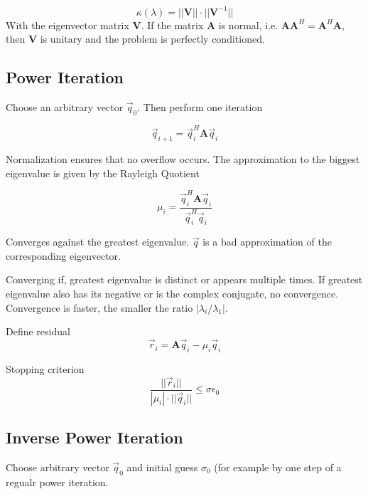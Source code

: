 \documentclass[
    a4paper,
    11pt
]{article}
\begin{document}
\begin{equation}
    \kappa(\lambda) = ||\mathbf{V}||\cdot||\mathbf{V}^{-1}||
\end{equation}
With the eigenvector matrix $\mathbf{V}$. If the matrix $\mathbf{A}$ is normal,
i.e. $\mathbf{AA}^H = \mathbf{A}^H \mathbf{A}$, then $\mathbf{V}$ is unitary and
the problem is perfectly conditioned.

\subsection{Power Iteration}

Choose an arbitrary vector $\vec{q}_0$. Then perform one iteration

\begin{equation}
    \vec{q}_{i+1} = \vec{q}_i^H \mathbf{A} \vec{q}_i
\end{equation}

Normalization ensures that no overflow occurs.
The approximation to the biggest eigenvalue is given by the Rayleigh Quotient

\begin{equation}
    \mu_i = \frac{\vec{q}_i^H \mathbf{A} \vec{q}_i}{\vec{q}_i^H \vec{q}_i}
\end{equation}

Converges against the greatest eigenvalue. $\vec{q}$ is a bad approximation of
the corresponding eigenvector.

Converging if, greatest eigenvalue is distinct or appears multiple times. 
If greatest eigenvalue also has its negative or is the complex conjugate, no
convergence.
Convergence is faster, the smaller the ratio $|\lambda_i/\lambda_1|$.

Define residual
\begin{equation}
    \vec{r}_i = \mathbf{A}\vec{q}_i - \mu_i \vec{q}_i
\end{equation}

Stopping criterion
\begin{equation}
    \frac{||\vec{r}_i||}{|\mu_i| \cdot ||\vec{q}_i||} \leq \sigma \epsilon_0
\end{equation}

\subsection{Inverse Power Iteration}

Choose arbitrary vector $\vec{q}_0$ and initial guess $\sigma_0$ (for example by
one step of a regualr power iteration.
\end{document}
